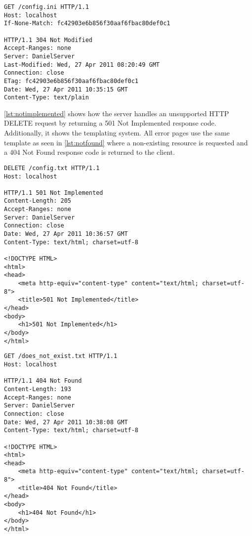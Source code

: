 \documentclass{sig-alternate}
\begin{document}
\begin{lstlisting}
GET /config.ini HTTP/1.1
Host: localhost
If-None-Match: fc42903e6b856f30aaf6fbac80def0c1

HTTP/1.1 304 Not Modified
Accept-Ranges: none
Server: DanielServer
Last-Modified: Wed, 27 Apr 2011 08:20:49 GMT
Connection: close
ETag: fc42903e6b856f30aaf6fbac80def0c1
Date: Wed, 27 Apr 2011 10:35:15 GMT
Content-Type: text/plain
\end{lstlisting}

\autoref{lst:notimplemented} shows how the server handles an unsupported HTTP
DELETE request by returning a 501 Not Implemented response code. Additionally,
it shows the templating system. All error pages use the same template as seen
in \autoref{lst:notfound} where a non-existing resource is requested and a 404
Not Found response code is returned to the client.

\begin{lstlisting}
DELETE /config.txt HTTP/1.1
Host: localhost

HTTP/1.1 501 Not Implemented
Content-Length: 205
Accept-Ranges: none
Server: DanielServer
Connection: close
Date: Wed, 27 Apr 2011 10:36:57 GMT
Content-Type: text/html; charset=utf-8

<!DOCTYPE HTML>
<html>
<head>
    <meta http-equiv="content-type" content="text/html; charset=utf-8">
    <title>501 Not Implemented</title>
</head>
<body>
    <h1>501 Not Implemented</h1>
</body>
</html>
\end{lstlisting}

\begin{lstlisting}
GET /does_not_exist.txt HTTP/1.1
Host: localhost

HTTP/1.1 404 Not Found
Content-Length: 193
Accept-Ranges: none
Server: DanielServer
Connection: close
Date: Wed, 27 Apr 2011 10:38:08 GMT
Content-Type: text/html; charset=utf-8

<!DOCTYPE HTML>
<html>
<head>
    <meta http-equiv="content-type" content="text/html; charset=utf-8">
    <title>404 Not Found</title>
</head>
<body>
    <h1>404 Not Found</h1>
</body>
</html>
\end{lstlisting}
\end{document}
